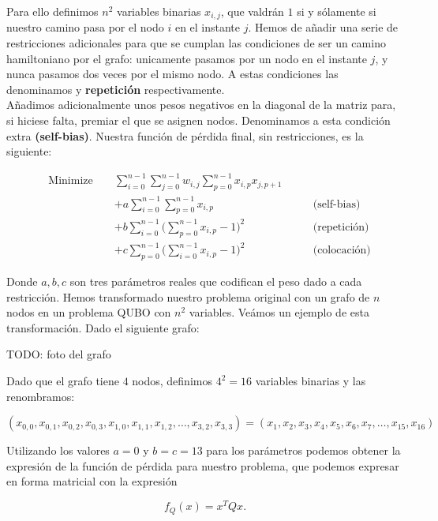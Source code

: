 \documentclass[11pt]{article}
\begin{document}
Para ello definimos $n^2$ variables binarias $x_{i,j}$, que valdrán $1$ si y sólamente si nuestro camino pasa por el nodo $i$ en el instante $j$. Hemos de añadir una serie de restricciones adicionales para que se cumplan las condiciones de ser un camino hamiltoniano por el grafo: unicamente pasamos por un nodo en el instante $j$, y nunca pasamos dos veces por el mismo nodo. A estas condiciones las denominamos  y \textbf{repetición} respectivamente. \\

Añadimos adicionalmente unos pesos negativos en la diagonal de la matriz para, si hiciese falta, premiar el que se asignen nodos. Denominamos a esta condición extra \textbf{(self-bias)}. Nuestra función de pérdida final, sin restricciones, es la siguiente:

\begin{equation}
	\begin{alignedat}{3}
		& \text{Minimize }	&& \sum_{i=0}^{n-1} \sum_{j=0}^{n-1} w_{i,j}\sum_{p=0}^{n-1} x_{i,p}x_{j,p+1} & \\
		& && + a \sum_{i=0}^{n-1} \sum_{p=0}^{n-1} x_{i,p} & \qquad \text{(self-bias)} \\
		& && + b \sum_{i=0}^{n-1} \Big( \sum_{p=0}^{n-1} x_{i,p} - 1 \Big)^2 & \qquad \text{(repetición)} \\
		& && + c \sum_{p=0}^{n-1} \Big( \sum_{i=0}^{n-1} x_{i,p} - 1 \Big)^2 & \qquad \text{(colocación)}
	\end{alignedat}
\end{equation}

Donde $a,b,c$ son tres parámetros reales que codifican el peso dado a cada restricción. Hemos transformado nuestro problema original con un grafo de $n$ nodos en un problema QUBO con $n^2$ variables. Veámos un ejemplo de esta transformación. Dado el siguiente grafo:

TODO: foto del grafo

Dado que el grafo tiene $4$ nodos, definimos $4^2 = 16$ variables binarias y las renombramos:

\[ (x_{0,0}, x_{0,1}, x_{0,2}, x_{0,3}, x_{1,0}, x_{1,1}, x_{1,2}, \dots, x_{3,2}, x_{3,3}) =
(x_1, x_2, x_3, x_4, x_5, x_6, x_7, \dots, x_{15}, x_{16}) \]

Utilizando los valores $a = 0$ y $b = c = 13$ para los parámetros podemos obtener la expresión de la función de pérdida para nuestro problema, que podemos expresar en forma matricial con la expresión 

\[ f_Q(x) = x^T Q x. \]
\end{document}

